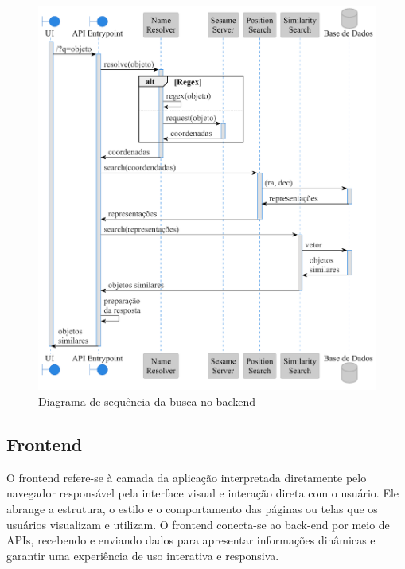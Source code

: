 \begin{figure}[!ht]
  \centering
  \caption{Diagrama de sequência da busca no backend}
  \label{fig:seq-back}
  \includegraphics[width=\linewidth]{diagrams/plots/sequence_back.pdf}
\end{figure}






\subsection{Frontend}
\label{sec:si-frontend}

O frontend refere-se à camada da aplicação interpretada diretamente pelo navegador responsável pela interface visual e interação direta com o usuário. Ele abrange a estrutura, o estilo e o comportamento das páginas ou telas que os usuários visualizam e utilizam. O frontend conecta-se ao back-end por meio de APIs, recebendo e enviando dados para apresentar informações dinâmicas e garantir uma experiência de uso interativa e responsiva.


